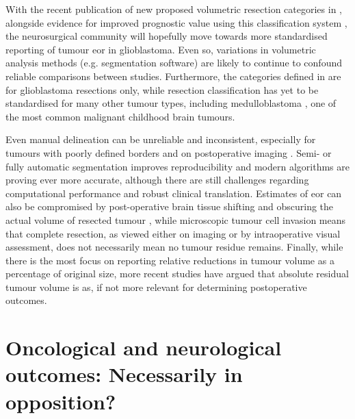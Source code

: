 \documentclass[12pt,phd,a4paper,twoside]{ucl_thesis}
\renewcommand{\textcite}[2][]{
\ifthenelse { \equal {#1} {} }  {\citeauthor{#2}\autocite{#2}}   {\citeauthor{#1}\autocite{#2}}}
\providecommand{\DIFaddtex}[1]{{\protect\color{blue} \sf #1}} %
\providecommand{\DIFaddbegin}{} %
\providecommand{\DIFaddend}{} %
\providecommand{\DIFadd}[1]{\texorpdfstring{\DIFaddtex{#1}}{#1}} %
\newcommand{\DIFaddincludegraphics}[2][]{{\color{blue}\fbox{\DIFOincludegraphics[#1]{#2}}}} %
\DeclareRobustCommand{\DIFaddbegin}{\DIFOaddbegin \let\includegraphics\DIFaddincludegraphics} %
\DeclareRobustCommand{\DIFaddend}{\DIFOaddend \let\includegraphics\DIFOincludegraphics} %
\begin{document}
\DIFaddbegin \DIFadd{With the recent publication of new proposed volumetric resection categories in \textcite{Karschnia2021}, alongside evidence for improved prognostic value using this classification system \textcite{Karschnia2023}, the neurosurgical community will hopefully move towards more standardised reporting of tumour }\gls{eor} \DIFadd{in glioblastoma.
Even so, variations in volumetric analysis methods (e.g. segmentation software) are likely to continue to confound reliable comparisons between studies.
Furthermore, the categories defined in \textcite{Karschnia2021} are for glioblastoma resections only, while resection classification has yet to be standardised for many other tumour types, including medulloblastoma}\autocite{Thompson2018}\DIFadd{, one of the most common malignant childhood brain tumours.
}\DIFaddend 


Even manual delineation can be unreliable and inconsistent, especially for tumours with poorly defined borders and on postoperative imaging \autocite{Ertl-Wagner2009,Bo2017,Visser2019}.
Semi- or fully automatic segmentation improves reproducibility\autocite{Ertl-Wagner2009,Sezer2020} and modern algorithms are proving ever more accurate, although there are still challenges regarding computational performance and robust clinical translation\autocite{Angulakshmi2017,Wadhwa2019,Fawzi2021}.
Estimates of \gls{eor} can also be compromised by post-operative brain tissue shifting and obscuring the actual volume of resected tumour \autocite{Schucht2014a}, while microscopic tumour cell invasion means that complete resection, as viewed either on imaging or by intraoperative visual assessment, does not necessarily mean no tumour residue remains\autocite{Yordanova2017}.
Finally, while there is the most focus on reporting relative reductions in tumour volume as a percentage of original size, more recent studies have argued that absolute residual tumour volume is as, if not more relevant for determining postoperative outcomes\autocite{Ius2012,Rincon-Torroella2019,Smith2008,Karschnia2021}.

\section{Oncological and neurological outcomes: Necessarily in opposition?}
\end{document}
